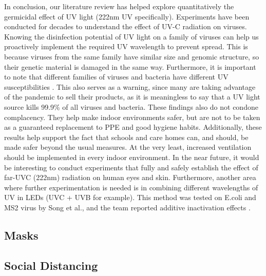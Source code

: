 \documentclass[11pt]{report}
\begin{document}
In conclusion, our literature review has helped explore quantitatively the germicidal effect of UV light (222nm UV specifically). Experiments have been conducted for decades to understand the effect of UV-C radiation on viruses. Knowing the disinfection potential of UV light on a family of viruses can help us proactively implement the required UV wavelength to prevent spread. This is because viruses from the same family have similar size and genomic structure, so their genetic material is damaged in the same way. Furthermore, it is important to note that different families of viruses and bacteria have different UV susceptibilities \cite{critical}. This also serves as a warning, since many are taking advantage of the pandemic to sell their products, as it is meaningless to say that a UV light source kills 99.9\% of all viruses and bacteria. 
These findings also do not condone complacency. They help make indoor environments safer, but are not to be taken as a guaranteed replacement to PPE and good hygiene habits. Additionally, these results help support the fact that schools and care homes can, and should, be made safer beyond the usual measures. At the very least, increased ventilation should be implemented in every indoor environment. 
In the near future, it would be interesting to conduct experiments that fully and safely establish the effect of far-UVC (222nm) radiation on human eyes and skin. Furthermore, another area where further experimentation is needed is in combining different wavelengths of UV in LEDs (UVC + UVB for example). This method was tested on E.coli and MS2 virus by Song et al., and the team reported additive inactivation effects \cite{additive}. 



			\subsection{Masks}
			\subsection{Social Distancing}
			
\end{document}
